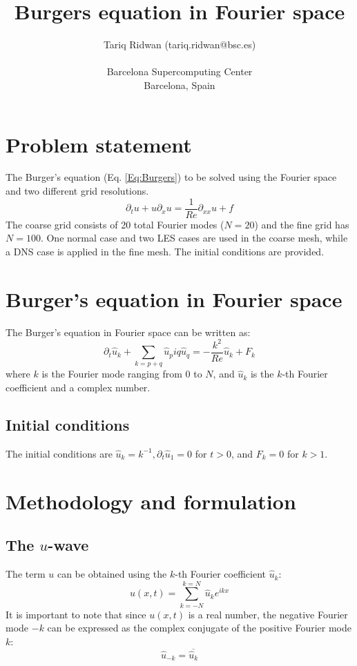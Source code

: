 \documentclass[a4paper]{article}
\begin{document}
	
\title{\textbf{Burgers equation in Fourier space}}
\author{Tariq Ridwan (tariq.ridwan@bsc.es)\\\\
	Barcelona Supercomputing Center\\
	Barcelona, Spain
}
\maketitle
\tableofcontents

\newpage
\listoffigures
\listoftables	
\newpage

\section{Problem statement}
The Burger's equation (Eq. \ref{Eq:Burgers}) to be solved using the Fourier space and two different grid resolutions.
\begin{equation}
	{\partial_t}u + u{\partial_x} u = \frac{1}{Re}{\partial_{xx}}u + f
	\label{Eq:Burgers}
\end{equation}
The coarse grid consists of 20 total Fourier modes ($ N=20 $) and the fine grid has $ N=100 $. One normal case and two LES cases are used in the coarse mesh, while a DNS case is applied in the fine mesh. The initial conditions are provided.
\section{Burger's equation in Fourier space}
The Burger's equation in Fourier space can be written as:
\begin{equation}
	{\partial_t} \hat{u}_k + \sum_{k=p+q} \hat{u}_p iq \hat{u}_q = -\frac{k^2}{Re} \hat{u}_k + F_k
	\label{Eq:Burgers_Fourier}
\end{equation}
where $ k $ is the Fourier mode ranging from 0 to $ N $, and $ \hat{u}_k $ is the $ k $-th Fourier coefficient and a complex number.

\subsection{Initial conditions}
The initial conditions are $ \hat{u}_k=k^{-1}, {\partial_t} \hat{u}_1 = 0 $ for $ t>0 $, and $ F_k=0 $ for $ k>1 $.
\section{Methodology and formulation}
\subsection{The $ u $-wave}
The term $ u $ can be obtained using the $ k $-th Fourier coefficient $ \hat{u}_k $:
\begin{equation}
	u(x,t) =  \sum_{k=-N}^{k=N} \hat{u}_k e^{ikx}
	\label{Eq:u}
\end{equation}
It is important to note that since $ u(x,t) $ is a real number, the negative Fourier mode $ -k $ can be expressed as the complex conjugate of the positive Fourier mode $ k $:
\begin{equation}
	\hat{u}_{-k} = \overline{\hat{u}_k}
	\label{Eq:u_comp}
\end{equation}
%
\end{document}
